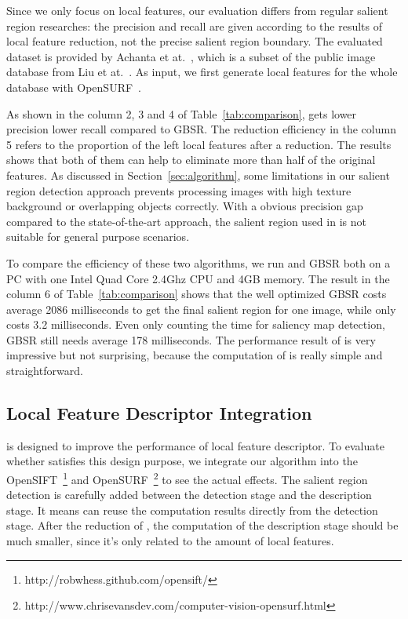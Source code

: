Since we only focus on local features, our evaluation differs from regular salient region researches: the precision and recall are given according to the results of local feature reduction, not the precise salient region boundary. The evaluated dataset is provided by Achanta et at.~\cite{achanta2009frequency}, which is a subset of the public image database from Liu et at.~\cite{liu2011learning}. As input, we first generate local features for the whole database with OpenSURF~\cite{evans2010opensurf}. 

As shown in the column 2, 3 and 4 of Table~\ref{tab:comparison}, {\sys} gets lower precision lower recall compared to GBSR. The reduction efficiency in the column 5 refers to the proportion of the left local features after a reduction. The results shows that both of them can help to eliminate more than half of the original features. As discussed in Section~\ref{sec:algorithm}, some limitations in our salient region detection approach prevents processing images with high texture background or overlapping objects correctly. With a obvious precision gap compared to the state-of-the-art approach, the salient region used in {\sys} is not suitable for general purpose scenarios.

To compare the efficiency of these two algorithms, we run {\sys} and GBSR both on a PC with one Intel Quad Core 2.4Ghz CPU and 4GB memory. The result in the column 6 of Table~\ref{tab:comparison} shows that the well optimized GBSR costs average 2086 milliseconds to get the final salient region for one image, while {\sys} only costs 3.2 milliseconds. Even only counting the time for saliency map detection, GBSR still needs average 178 milliseconds. The performance result of {\sys} is very impressive but not surprising, because the computation of {\sys} is really simple and straightforward.

\subsection{Local Feature Descriptor Integration}
\label{sec:evaluation_integration}

{\sys} is designed to improve the performance of local feature descriptor. To evaluate whether {\sys} satisfies this design purpose, we integrate our algorithm into the OpenSIFT~\footnote{http://robwhess.github.com/opensift/} and OpenSURF~\footnote{http://www.chrisevansdev.com/computer-vision-opensurf.html} to see the actual effects. The salient region detection is carefully added between the detection stage and the description stage. It means {\sys} can reuse the computation results directly from the detection stage. After the reduction of {\sys}, the computation of the description stage should be much smaller, since it's only related to the amount of local features.

